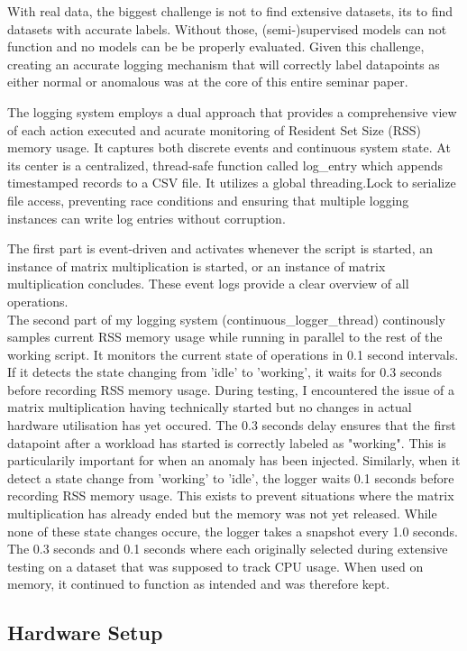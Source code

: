 \documentclass[12pt,oneside]{article}
\begin{document}
With real data, the biggest challenge is not to find extensive datasets, its to find datasets with accurate labels. Without those, (semi-)supervised models can not function and no models can be be properly evaluated. Given this challenge, creating an accurate logging mechanism that will correctly label datapoints as either normal or anomalous was at the core of this entire seminar paper. \par
The logging system employs a dual approach that provides a comprehensive view of each action executed and acurate monitoring of Resident Set Size (RSS) memory usage. It captures both discrete events and continuous system state. At its center is a centralized, thread-safe function called log\_entry which appends timestamped records to a CSV file. It utilizes a global threading.Lock to serialize file access, preventing race conditions and ensuring that multiple logging instances can write log entries without corruption. \par
The first part is event-driven and activates whenever the script is started, an instance of matrix multiplication is started, or an instance of matrix multiplication concludes. These event logs provide a clear overview of all operations. \\
The second part of my logging system (continuous\_logger\_thread) continously samples current RSS memory usage while running in parallel to the rest of the working script. It monitors the current state of operations in 0.1 second intervals. If it detects the state changing from 'idle' to 'working', it waits for 0.3 seconds before recording RSS memory usage. During testing, I encountered the issue of a matrix multiplication having technically started but no changes in actual hardware utilisation has yet occured. The 0.3 seconds delay ensures that the first datapoint after a workload has started is correctly labeled as "working". This is particularily important for when an anomaly has been injected. Similarly, when it detect a state change from 'working' to 'idle', the logger waits 0.1 seconds before recording RSS memory usage. This exists to prevent situations where the matrix multiplication has already ended but the memory was not yet released. While none of these state changes occure, the logger takes a snapshot every 1.0 seconds. The 0.3 seconds and 0.1 seconds where each originally selected during extensive testing on a dataset that was supposed to track CPU usage. When used on memory, it continued to function as intended and was therefore kept.

\subsection{Hardware Setup}
\end{document}
